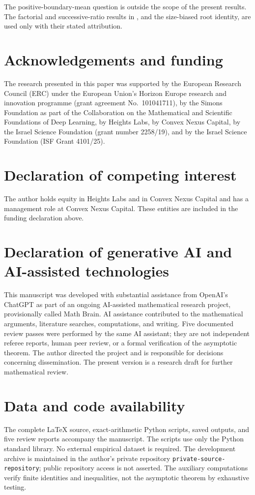 \documentclass[11pt]{amsart}
\theoremstyle{remark}\newtheorem{remark}[theorem]{Remark}
\begin{document}
The positive-boundary-mean question is outside the scope of the present
results. The factorial and successive-ratio results in \cite{JJS}, and the
size-biased root identity, are used only with their stated attribution.


\section*{Acknowledgements and funding}
The research presented in this paper was supported by the European Research
Council (ERC) under the European Union's Horizon Europe research and
innovation programme (grant agreement No.~101041711), by the Simons
Foundation as part of the Collaboration on the Mathematical and Scientific
Foundations of Deep Learning, by Heights Labs, by Convex Nexus Capital, by
the Israel Science Foundation (grant number 2258/19), and by the Israel
Science Foundation (ISF Grant 4101/25).

\section*{Declaration of competing interest}
The author holds equity in Heights Labs and in Convex Nexus Capital and
has a management role at Convex Nexus Capital. These entities are included
in the funding declaration above.

\section*{Declaration of generative AI and AI-assisted technologies}
This manuscript was developed with substantial assistance from OpenAI's
ChatGPT as part of an ongoing AI-assisted mathematical research project,
provisionally called Math Brain. AI assistance contributed to the
mathematical arguments, literature searches, computations, and writing.
Five documented review passes were performed by the same AI assistant;
they are not independent referee reports, human peer review, or a formal
verification of the asymptotic theorem. The author directed the project
and is responsible for decisions concerning dissemination. The present
version is a research draft for further mathematical review.

\section*{Data and code availability}
The complete \LaTeX{} source, exact-arithmetic Python scripts, saved outputs,
and five review reports accompany the manuscript. The scripts use only the
Python standard library. No external empirical dataset is required.
The development archive is maintained in the author's private repository
\texttt{private-source-repository}; public repository access is not
asserted. The auxiliary computations verify finite identities and
inequalities, not the asymptotic theorem by exhaustive testing.
\end{document}
